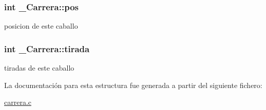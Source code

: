 \subsubsection[{\texorpdfstring{pos}{pos}}]{\setlength{\rightskip}{0pt plus 5cm}int \+\_\+\+Carrera\+::pos}\hypertarget{struct__Carrera_a2c723a949d2125c8989fabf48028ba12}{}\label{struct__Carrera_a2c723a949d2125c8989fabf48028ba12}
posicion de este caballo 
\subsubsection[{\texorpdfstring{tirada}{tirada}}]{\setlength{\rightskip}{0pt plus 5cm}int \+\_\+\+Carrera\+::tirada}\hypertarget{struct__Carrera_ae091854540d0a874642d92c971a0f86a}{}\label{struct__Carrera_ae091854540d0a874642d92c971a0f86a}
tiradas de este caballo 

La documentación para esta estructura fue generada a partir del siguiente fichero\+:\begin{DoxyCompactItemize}
\item 
\hyperlink{carrera_8c}{carrera.\+c}\end{DoxyCompactItemize}
